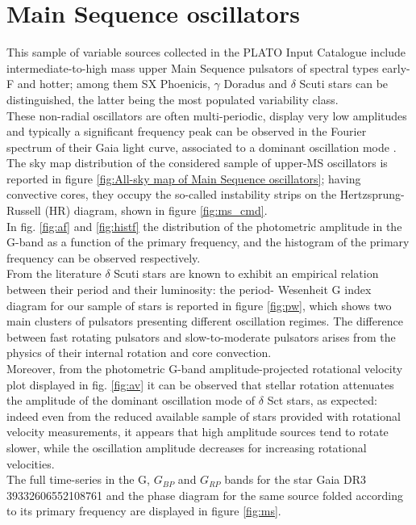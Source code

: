 \newpage

\section{Main Sequence oscillators}

This sample of variable sources collected in the PLATO Input Catalogue include intermediate-to-high mass upper Main Sequence pulsators of spectral types early-F and hotter; among them SX Phoenicis, $\gamma$ Doradus and $\delta$ Scuti stars can be distinguished, the latter being the most populated variability class.\\
These non-radial oscillators are often multi-periodic, display very low amplitudes and typically a significant frequency peak  can be observed in the Fourier spectrum of their Gaia light curve, associated to a dominant oscillation mode \parencite{refId2}.\\
The sky map distribution of the considered sample of upper-MS oscillators is reported in figure \ref{fig:All-sky map of Main Sequence oscillators}; having convective cores, they occupy the so-called instability strips on the Hertzsprung-Russell (HR) diagram, shown in figure \ref{fig:ms_cmd}.\\
In fig. \ref{fig:af} and \ref{fig:histf} the distribution of the photometric amplitude in the G-band as a function of the primary frequency, and the histogram of the primary frequency can be observed respectively.\\
From the literature \parencite{refId2} $\delta$ Scuti stars are known to exhibit an empirical relation between their period and their luminosity: the period- Wesenheit G index diagram for our sample of stars is reported in figure \ref{fig:pw}, which shows two main clusters of pulsators presenting different oscillation regimes. 
The difference between fast rotating pulsators and slow-to-moderate pulsators arises from the physics of their internal rotation and core
convection.\\
Moreover, from the photometric G-band amplitude-projected rotational velocity plot displayed in fig. \ref{fig:av} it can be observed that stellar rotation attenuates the amplitude of the dominant oscillation mode of $\delta$ Sct stars, as expected: indeed even from the reduced available sample of stars provided with rotational velocity measurements, it appears that high amplitude sources tend to rotate slower, while the oscillation amplitude decreases for increasing rotational velocities.\\
The full time-series in the G, $G_{BP}$ and $G_{RP}$ bands for the star Gaia DR3 39332606552108761 and the phase diagram for the
same source folded according to its primary frequency are displayed in figure \ref{fig:ms}.






